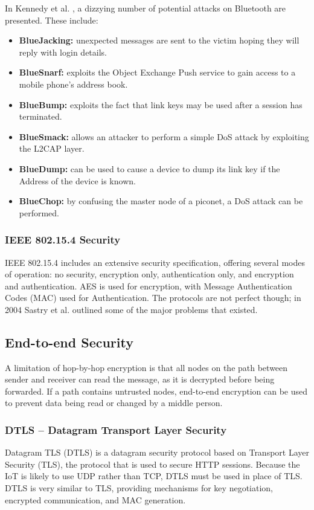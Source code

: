 \documentclass[10pt,journal,compsoc]{IEEEtran}
\begin{document}
In Kennedy et al. \cite{Kennedy2008}, a dizzying number of potential attacks on
Bluetooth are presented. These include: 
\begin{itemize}[$\bullet$]
\item {\bf BlueJacking:} unexpected messages are sent to the victim hoping they
will reply with login details. 
\item {\bf BlueSnarf:} exploits the Object Exchange Push service to gain
access to a mobile phone's address book. 
\item {\bf BlueBump:} exploits the fact that link keys may be used after a session
has terminated. 
\item {\bf BlueSmack:} allows an attacker to perform a simple DoS attack by
exploiting the L2CAP layer.
\item {\bf BlueDump:} can be used to cause a device to dump its link key if the
 Address of the device is known. 
\item {\bf BlueChop:} by confusing the master node of a piconet, a DoS attack can be
performed. 
\end{itemize}

\subsubsection{IEEE 802.15.4 Security}
IEEE 802.15.4 includes an extensive security specification, offering several
modes of operation: no security, encryption only, authentication only, and
encryption and authentication. AES is used for encryption, with Message
Authentication Codes (MAC) used for Authentication. The protocols are not
perfect though; in 2004 Sastry et al. \cite{Sastry2004} outlined some of the
major problems that existed.  


\subsection{End-to-end Security}
A limitation of hop-by-hop encryption is that all nodes on the path between
sender and receiver can read the message, as it is decrypted before being
forwarded. If a path contains untrusted nodes, end-to-end encryption can be
used to prevent data being read or changed by a middle person. 

\subsubsection{DTLS -- Datagram Transport Layer Security}
Datagram TLS (DTLS) is a datagram security protocol based on Transport Layer
Security (TLS), the protocol that is used to secure HTTP sessions. Because the
IoT is likely to use UDP rather than TCP, DTLS must be used in place of TLS.
DTLS is very similar to TLS, providing mechanisms for key negotiation,
encrypted communication, and MAC generation.  
\end{document}
